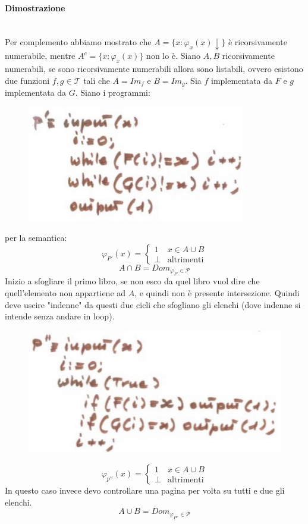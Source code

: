 \documentclass{article}
\begin{document}
\paragraph{Dimostrazione}\mbox{}\\
Per complemento abbiamo mostrato che $A=\{x:\varphi_x(x)\downarrow\}$ è ricorsivamente
numerabile, mentre $A^c=\{x:\varphi_x(x)\}$ non lo è. Siano $A,B$ ricorsivamente numerabili,
se sono ricorsivamente numerabili allora sono listabili, ovvero esistono due funzioni $f,g\in\mathcal{T}$
tali che $A=Im_f$ e $B=Im_g$. Sia $f$ implementata da $F$ e $g$ implementata da $G$. Siano i programmi:
\begin{figure}[H]
    \centering
    \includegraphics[scale=0.6]{images/inters_AB.png}
\end{figure}
per la semantica:
\[
    \varphi_{P'}(x)=
    \begin{cases}
        1 & x\in A\cup B\\
        \bot &\text{altrimenti}
    \end{cases}
    \]
$$A\cap B = Dom_{\varphi_{P'}\in\mathcal{P}}$$
Inizio a sfogliare il primo libro, se non esco da quel libro vuol dire che quell'elemento
non appartiene ad $A$, e quindi non è presente intersezione. Quindi deve uscire "indenne"
da questi due cicli che sfogliano gli elenchi (dove indenne si intende senza andare in loop).

\begin{figure}[H]
    \centering
    \includegraphics[scale=0.6]{images/unionie_AB.png}
\end{figure}
\[
    \varphi_{p''}(x)=
    \begin{cases}
        1 & x\in A\cup B\\
        \bot & \text{altrimenti}
    \end{cases}
\]
In questo caso invece devo controllare una pagina per volta su tutti e due gli elenchi.
$$A\cup B=Dom_{\varphi_{P''}\in\mathcal{P}}$$
\end{document}
